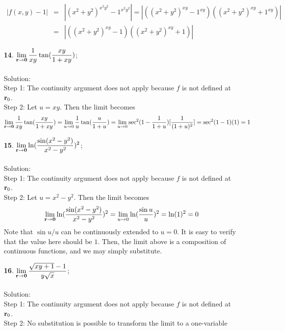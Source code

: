 \documentclass[12pt]{amsbook}
\begin{document}
\begin{enumerate}
\begin{eqnarray*}
|f(x,y)-1|&=&|(x^2+y^2)^{x^2y^2}-1^{x^2y^2}|=|((x^2+y^2)^{xy}-1^{xy})((x^2+y^2)^{xy}+1^{xy})|\\
&=&|((x^2+y^2)^{xy}-1)((x^2+y^2)^{xy}+1)|
\end{eqnarray*}
\item[{\small\bf 14}.] $\! \begin{aligned}[t]
\lim_{{\bf r} \rightarrow {\bf 0}}\frac{1}{xy}\tan(\frac{xy}{1+xy}) \end{aligned}$;
\\
\\
{\sc Solution}:
\\
{\sf Step 1}: The continuity argument does not apply because $f$ is not defined at ${\bf r}_0$.
\\
{\sf Step 2}: Let $u=xy$. Then the limit becomes
$$\lim_{{\bf r} \rightarrow {\bf 0}}\frac{1}{xy}\tan(\frac{xy}{1+xy})=\lim_{u \rightarrow 0}\frac{1}{u}\tan(\frac{u}{1+u})=\lim_{u \rightarrow 0}\sec^2(1-\frac{1}{1+u})[\frac{1}{(1+u)^2}]=\sec^2(1-1)(1)=1$$
\item[{\small\bf 15}.] $\! \begin{aligned}[t]
\lim_{{\bf r} \rightarrow {\bf 0}}\ln(\frac{\sin(x^2-y^2)}{x^2-y^2})^2 \end{aligned}$;
\\
\\
{\sc Solution}:
\\
{\sf Step 1}: The continuity argument does not apply because $f$ is not defined at ${\bf r}_0$.
\\
{\sf Step 2}: Let $u=x^2-y^2$. Then the limit becomes
$$\lim_{{\bf r} \rightarrow {\bf 0}}\ln(\frac{\sin(x^2-y^2)}{x^2-y^2})^2=\lim_{u \rightarrow 0}\ln(\frac{\sin u}{u})^2=\ln(1)^2=0$$
Note that $\sin u/u$ can be continuously extended to $u=0$. It is easy to verify that the value here should be $1$. Then, the limit above is a composition of continuous functions, and we may simply substitute.
\\ 
\item[{\small\bf 16}.] $\! \begin{aligned}[t]
\lim_{{\bf r} \rightarrow {\bf 0}}\frac{\sqrt{xy+1}-1}{y\sqrt{x}} \end{aligned}$;
\\
\\
{\sc Solution}:
\\
{\sf Step 1}: The continuity argument does not apply because $f$ is not defined at ${\bf r}_0$.
\\
{\sf Step 2}: No substitution is possible to transform the limit to a one-variable

\end{enumerate}
\end{document}
